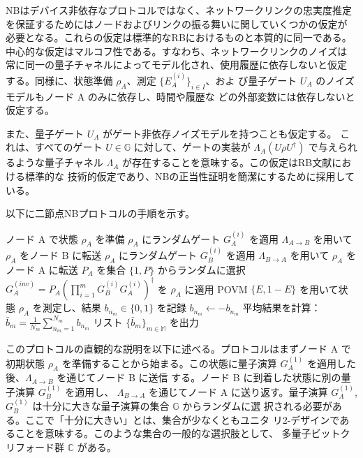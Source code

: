 \documentclass[12pt,a4paper,titlepage,dvipdfmx]{article}
\begin{document}
NBはデバイス非依存なプロトコルではなく、ネットワークリンクの忠実度推定
を保証するためにはノードおよびリンクの振る舞いに関していくつかの仮定が
必要となる。これらの仮定は標準的なRBにおけるものと本質的に同一である。
中心的な仮定はマルコフ性である。すなわち、ネットワークリンクのノイズは
常に同一の量子チャネルによってモデル化され、使用履歴に依存しないと仮定
する。同様に、状態準備 $\rho_A$、測定 $\{E_A^{(i)}\}_{i \in I}$、およ
び量子ゲート $U_A$ のノイズモデルもノード A のみに依存し、時間や履歴な
どの外部変数には依存しないと仮定する。

また、量子ゲート $U_A$ がゲート非依存ノイズモデルを持つことも仮定する。
これは、すべてのゲート $U \in \mathbb{G}$ に対して、ゲートの実装が
$\Lambda_A(U\rho U^\dagger)$ で与えられるような量子チャネル
$\Lambda_A$ が存在することを意味する。この仮定はRB文献における標準的な
技術的仮定であり、NBの正当性証明を簡潔にするために採用している。

以下に二節点NBプロトコルの手順を示す。

\begin{algorithm}[H]
\caption{二節点ネットワークベンチマーキングプロトコル}
\begin{algorithmic}[1]
        \STATE ノード A で状態 $\rho_A$ を準備
            \STATE $\rho_A$ にランダムゲート $G_A^{(i)}$ を適用
            \STATE $\Lambda_{A \to B}$ を用いて $\rho_A$ をノード B に転送
            \STATE $\rho_A$ にランダムゲート $G_B^{(i)}$ を適用
            \STATE $\Lambda_{B \to A}$ を用いて $\rho_A$ をノード A に転送
        \ENDFOR
        \STATE $P_A$ を集合 $\{1, P\}$ からランダムに選択
        \STATE $G_A^{(inv)} = P_A \left( \prod_{i=1}^{m} G_B^{(i)} G_A^{(i)} \right)^\dagger$ を $\rho_A$ に適用
        \STATE POVM $\{E, 1-E\}$ を用いて状態 $\rho_A$ を測定し、結果 $b_{n_m} \in \{0, 1\}$ を記録
            \STATE $b_{n_m} \gets -b_{n_m}$
        \ENDIF
    \ENDFOR
    \STATE 平均結果を計算：$\bar{b}_m = \frac{1}{N_m} \sum_{n_m=1}^{N_m} b_{n_m}$
\ENDFOR
\STATE リスト $\{\bar{b}_m\}_{m \in \mathbb{M}}$ を出力
\end{algorithmic}
\end{algorithm}

このプロトコルの直観的な説明を以下に述べる。プロトコルはまずノード A
で初期状態 $\rho_A$ を準備することから始まる。この状態に量子演算
$G_A^{(1)}$ を適用した後、$\Lambda_{A \to B}$ を通じてノード B に送信
する。ノード B に到着した状態に別の量子演算 $G_B^{(1)}$ を適用し、
$\Lambda_{B \to A}$ を通じてノード A に送り返す。量子演算 $G_A^{(1)}$,
$G_B^{(1)}$ は十分に大きな量子演算の集合 $\mathbb{G}$ からランダムに選
択される必要がある。ここで「十分に大きい」とは、集合が少なくともユニタ
リ2-デザインであることを意味する。このような集合の一般的な選択肢として、
多量子ビットクリフォード群 $\mathbb{C}$ がある。
\end{document}
